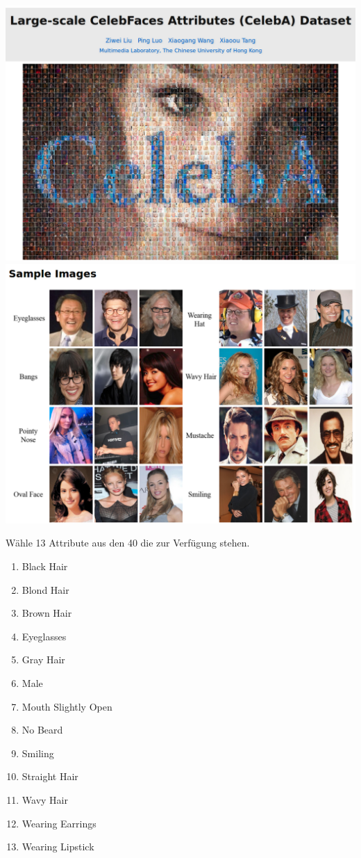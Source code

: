 \documentclass[12.5pt]{scrartcl}
\begin{document}
	\includegraphics[width=0.88\linewidth]{images/CelebA} \\
	\includegraphics[width=0.88\linewidth]{images/CelebAExamples}
	
	Wähle 13 Attribute aus den 40 die zur Verfügung stehen.
		\begin{enumerate}
			\item Black Hair
			\item Blond Hair
			\item Brown Hair
			\item Eyeglasses
			\item Gray Hair
			\item Male
			\item Mouth Slightly Open
			\item No Beard
			\item Smiling
			\item Straight Hair
			\item Wavy Hair
			\item Wearing Earrings
			\item Wearing Lipstick
		\end{enumerate}
\end{document}
